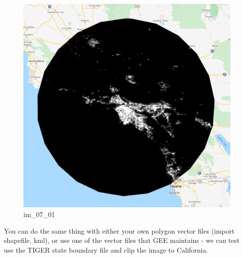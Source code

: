 \documentclass[
]{article}
\begin{document}
\begin{figure}
\centering
\includegraphics{./im/im_07_01.png}
\caption{im\_07\_01}
\end{figure}

You can do the same thing with either your own polygon vector files (import shapefile, kml), or use one of the vector files that GEE maintains - we can test use the TIGER state boundary file and clip the image to California.
\end{document}

